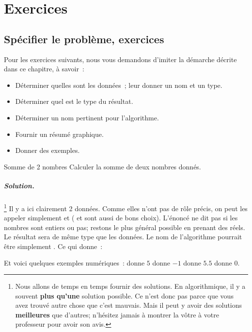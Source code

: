 \chapter{Exercices}

\minitoc

\section{Spécifier le problème, exercices}
	
		Pour les exercices suivants, 
		nous vous demandons d’imiter la démarche décrite dans ce chapitre, 
		à savoir~:
		\begin{itemize}
			\item Déterminer quelles sont les données~;
				leur donner un nom et un type.
			\item Déterminer quel est le type du résultat.
			\item Déterminer un nom pertinent pour l’algorithme.
			\item Fournir un résumé graphique.
			\item Donner des exemples.
		\end{itemize}
	
		\begin{Exercice}{Somme de 2 nombres}
			Calculer la somme de deux nombres donnés.
			\paragraph{Solution.}%
			\footnote{%
				Nous allons de temps en temps 
				fournir des solutions.
				En algorithmique,
				il y a souvent \textbf{plus qu’une} solution possible.
				Ce n’est donc pas parce que vous avez trouvé autre chose
				que c’est mauvais.
				Mais il peut y avoir des solutions \textbf{meilleures}
				que d’autres; 
				n’hésitez jamais à montrer la vôtre
				à votre professeur pour avoir son avis.
			}
			Il y a ici clairement 2 données.
			Comme elles n’ont pas de rôle précis,
			on peut les appeler simplement 
			et 
			( et  sont aussi de bons choix).
			L’énoncé ne dit pas si les nombres sont entiers ou pas;
			restons le plus général possible en prenant des réels.
			Le résultat sera de même type que les données.
			Le nom de l’algorithme pourrait être simplement .
			Ce qui donne~:
			\begin{center}
			\end{center}			 
			Et voici quelques exemples numériques~:	
				 donne $5$      \quad
				 donne $-1$    \quad
				 donne $5.5$  \quad
				 donne $0$.
		\end{Exercice}
	
